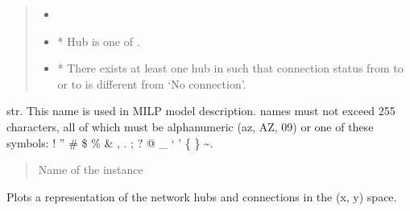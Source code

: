 \documentclass[letterpaper,10pt,english]{sphinxmanual}
\begin{document}
\begin{fulllineitems}
\begin{fulllineitems}
\begin{quote}
\begin{description}
\sphinxAtStartPar
\begin{itemize}
\item {} 
\sphinxAtStartPar
{}

\item {} 
\sphinxAtStartPar
* Hub  is one of .

\item {} 
\sphinxAtStartPar
* There exists at least one hub  in  such that connection status from  to  or  to  \textendash{} is different from ‘No connection’.

\end{itemize}


\end{description}\end{quote}

\end{fulllineitems}


\begin{fulllineitems}
\label{\detokenize{generated/tamos.network.NonThermalNetwork:tamos.network.NonThermalNetwork.name}}
\pysigstartsignatures
{}
\pysigstopsignatures
\sphinxAtStartPar
str.
This name is used in MILP model description.
names must not exceed 255 characters,
all of which must be alphanumeric (a\sphinxhyphen{}z, A\sphinxhyphen{}Z, 0\sphinxhyphen{}9) or one of these symbols:
! ” \# \$ \% \& , . ; ? @ \_ ‘ ’ \{ \} \textasciitilde{}.
\begin{quote}\begin{description}
\sphinxAtStartPar
Name of the instance

\end{description}\end{quote}

\end{fulllineitems}


\begin{fulllineitems}
\label{\detokenize{generated/tamos.network.NonThermalNetwork:tamos.network.NonThermalNetwork.plot}}
\pysigstartsignatures
{}
\pysigstopsignatures
\sphinxAtStartPar
Plots a representation of the network hubs and connections in the (x, y) space.


\end{fulllineitems}
\end{fulllineitems}
\end{document}
